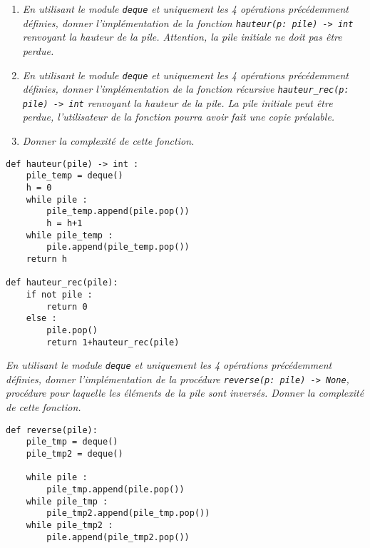 \begin{exemple}
\begin{enumerate}
\item \textit{En utilisant le module \texttt{deque} et uniquement les 4 opérations précédemment définies, donner l'implémentation de la fonction \texttt{hauteur(p: pile) -> int} renvoyant la hauteur de la pile. Attention, la pile initiale ne doit pas être perdue.}

\item \textit{En utilisant le module \texttt{deque} et uniquement les 4 opérations précédemment définies, donner l'implémentation de la fonction récursive \texttt{hauteur\_rec(p: pile) -> int} renvoyant la hauteur de la pile. La pile initiale peut être perdue, l'utilisateur de la fonction pourra avoir fait  une copie préalable.}

\item \textit{Donner la complexité de cette fonction.}
\end{enumerate}
\ifprof
\begin{lstlisting}
def hauteur(pile) -> int : 
    pile_temp = deque()
    h = 0
    while pile : 
        pile_temp.append(pile.pop())
        h = h+1
    while pile_temp : 
        pile.append(pile_temp.pop())
    return h
    
def hauteur_rec(pile):
    if not pile : 
        return 0
    else :
        pile.pop()
        return 1+hauteur_rec(pile)
\end{lstlisting}
\else
\vspace{10cm}
\fi

\end{exemple}



\begin{exemple}
\textit{En utilisant le module \texttt{deque} et uniquement les 4 opérations précédemment définies, donner l'implémentation de la procédure \texttt{reverse(p: pile) -> None}, procédure pour laquelle les éléments de la pile sont inversés. Donner la complexité de cette fonction.}

\begin{lstlisting}
def reverse(pile):
    pile_tmp = deque()
    pile_tmp2 = deque()

    while pile : 
        pile_tmp.append(pile.pop())
    while pile_tmp : 
        pile_tmp2.append(pile_tmp.pop())
    while pile_tmp2 : 
        pile.append(pile_tmp2.pop())
\end{lstlisting}
\end{exemple}


